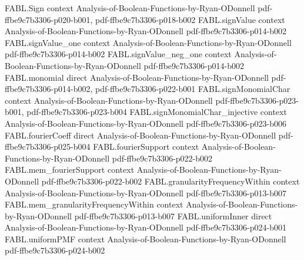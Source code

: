 \begin{theorem}
\label{FABL.FiniteFourierBasis.fourierCoeff_eq_zero_of_isSumOfJuntasAtMost}
\leanok
{}
\proofstep
  {FABL.Sign}
  {context}
  {Analysis-of-Boolean-Functions-by-Ryan-ODonnell}
  {pdf-ffbe9c7b3306-p020-b001,
    pdf-ffbe9c7b3306-p018-b002}
\proofstep
  {FABL.signValue}
  {context}
  {Analysis-of-Boolean-Functions-by-Ryan-ODonnell}
  {pdf-ffbe9c7b3306-p014-b002}
\proofstep
  {FABL.signValue_one}
  {context}
  {Analysis-of-Boolean-Functions-by-Ryan-ODonnell}
  {pdf-ffbe9c7b3306-p014-b002}
\proofstep
  {FABL.signValue_neg_one}
  {context}
  {Analysis-of-Boolean-Functions-by-Ryan-ODonnell}
  {pdf-ffbe9c7b3306-p014-b002}
\proofstep
  {FABL.monomial}
  {direct}
  {Analysis-of-Boolean-Functions-by-Ryan-ODonnell}
  {pdf-ffbe9c7b3306-p014-b002,
    pdf-ffbe9c7b3306-p022-b001}
\proofstep
  {FABL.signMonomialChar}
  {context}
  {Analysis-of-Boolean-Functions-by-Ryan-ODonnell}
  {pdf-ffbe9c7b3306-p023-b001,
    pdf-ffbe9c7b3306-p023-b004}
\proofstep
  {FABL.signMonomialChar_injective}
  {context}
  {Analysis-of-Boolean-Functions-by-Ryan-ODonnell}
  {pdf-ffbe9c7b3306-p023-b006}
\proofstep
  {FABL.fourierCoeff}
  {direct}
  {Analysis-of-Boolean-Functions-by-Ryan-ODonnell}
  {pdf-ffbe9c7b3306-p025-b004}
\proofstep
  {FABL.fourierSupport}
  {context}
  {Analysis-of-Boolean-Functions-by-Ryan-ODonnell}
  {pdf-ffbe9c7b3306-p022-b002}
\proofstep
  {FABL.mem_fourierSupport}
  {context}
  {Analysis-of-Boolean-Functions-by-Ryan-ODonnell}
  {pdf-ffbe9c7b3306-p022-b002}
\proofstep
  {FABL.granularityFrequencyWithin}
  {context}
  {Analysis-of-Boolean-Functions-by-Ryan-ODonnell}
  {pdf-ffbe9c7b3306-p013-b007}
\proofstep
  {FABL.mem_granularityFrequencyWithin}
  {context}
  {Analysis-of-Boolean-Functions-by-Ryan-ODonnell}
  {pdf-ffbe9c7b3306-p013-b007}
\proofstep
  {FABL.uniformInner}
  {direct}
  {Analysis-of-Boolean-Functions-by-Ryan-ODonnell}
  {pdf-ffbe9c7b3306-p024-b001}
\proofstep
  {FABL.uniformPMF}
  {context}
  {Analysis-of-Boolean-Functions-by-Ryan-ODonnell}
  {pdf-ffbe9c7b3306-p024-b002}

\end{theorem}

